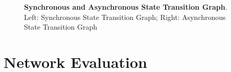 \begin{figure}[h]
\begin{varwidth}{\linewidth}
  \end{varwidth}
  \caption[Synchronous and Asynchronous State Transition Graph]{\textbf{Synchronous and Asynchronous State Transition Graph}. Left: Synchronous State Transition Graph; Right: Asynchronous State Transition Graph}
\label{fig:Fig.4.}
\end{figure}

\citep{REMY2008335}

\section{Network Evaluation}

